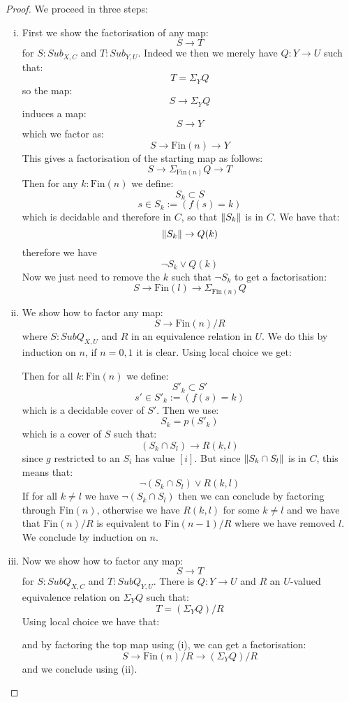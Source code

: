 \begin{proof}
We proceed in three steps:
\begin{enumerate}[(i)]
\item First we show the factorisation of any map:
\[S\to T\]
for $S:Sub_{X,C}$ and $T:Sub_{Y,U}$. Indeed we then we merely have $Q:Y\to U$ such that:
\[T = \Sigma_YQ\]
so the map:
\[S\to \Sigma_YQ\]
induces a map:
\[S\to Y\]
which we factor as:
\[S\to \mathrm{Fin}(n) \to Y\]
This gives a factorisation of the starting map as follows:
\[S\to \Sigma_{\mathrm{Fin}(n)} Q \to T\]
Then for any $k:\mathrm{Fin}(n)$ we define:
\[S_k \subset S\]
\[s\in S_k := (f(s) = k)\]
which is decidable and therefore in $C$, so that $\lVert S_k \rVert$ is in $C$. We have that:
\[\lVert S_k \rVert \to Q(k)\]
therefore we have
\[\neg S_k \lor Q(k)\]
Now we just need to remove the $k$ such that $\neg S_k$ to get a factorisation:
\[S\to \mathrm{Fin}(l) \to \Sigma_{\mathrm{Fin}(n)}Q\]
\item We show how to factor any map:
\[S\to \mathrm{Fin}(n)/R\]
where $S:SubQ_{X,U}$ and $R$ in an equivalence relation in $U$. We do this by induction on $n$, if $n=0,1$ it is clear. Using local choice we get:
\begin{center}
\end{center}
Then for all $k:\mathrm{Fin}(n)$ we define:
\[S'_k \subset S'\]
\[s'\in S'_k := (f(s) = k)\]
which is a decidable cover of $S'$. Then we use:
\[S_k = p(S'_k)\]
which is a cover of $S$ such that:
\[(S_k\cap S_l) \to R(k,l)\]
since $g$ restricted to an $S_i$ has value $[i]$. But since $\lVert S_k\cap S_l \rVert$ is in $C$, this means that:
\[\neg(S_k\cap S_l) \lor R(k,l)\]
If for all $k\not=l$ we have $\neg(S_k\cap S_l)$ then we can conclude by factoring through $\mathrm{Fin}(n)$, otherwise we have $R(k,l)$ for some $k\not=l$ and we have that $\mathrm{Fin}(n)/R$ is equivalent to $\mathrm{Fin}(n-1)/R$ where we have removed $l$. We conclude by induction on $n$.
\item  Now we show how to factor any map:
\[S\to T\]
for $S:SubQ_{X,C}$ and $T:SubQ_{Y,U}$. There is $Q:Y\to U$ and $R$ an $U$-valued equivalence relation on $\Sigma_YQ$ such that:
\[T = (\Sigma_YQ)/R\]
Using local choice we have that:
\begin{center}
\end{center}
and by factoring the top map using (i), we can get a factorisation:
\[S\to \mathrm{Fin}(n)/R\to (\Sigma_YQ)/R\]
and we conclude using (ii).
\end{enumerate}
\end{proof}


